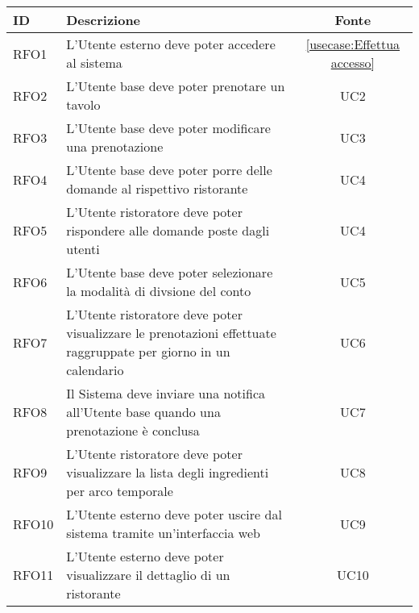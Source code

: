 \begin{table}[H]
	\renewcommand{\arraystretch}{1.5}
	\centering
	\begin{tabularx}{\textwidth}{l|X|c}
		\textbf{ID} & \textbf{Descrizione}                                                                                                      & \textbf{Fonte} \\
		\hline
		RFO1        & L'Utente esterno deve poter accedere al sistema                                                                           & \autoref{usecase:Effettua accesso}            \\
		\hline
		RFO2        & L'Utente base deve poter prenotare un tavolo                                                                              & UC2            \\
		\hline
		RFO3        & L'Utente base deve poter modificare una prenotazione                                                                      & UC3            \\
		\hline
		RFO4        & L'Utente base deve poter porre delle domande al rispettivo ristorante                                                     & UC4            \\
		\hline
		RFO5        & L'Utente ristoratore deve poter rispondere alle domande poste dagli utenti                                                & UC4            \\
		\hline
		RFO6        & L'Utente base deve poter selezionare la modalità di divsione del conto                                                    & UC5            \\
		\hline
		RFO7        & L'Utente ristoratore deve poter visualizzare le prenotazioni effettuate raggruppate per giorno in un calendario           & UC6            \\
		\hline
		RFO8        & Il Sistema deve inviare una notifica all'Utente base quando una prenotazione è conclusa                                   & UC7            \\
		\hline
		RFO9        & L'Utente ristoratore deve poter visualizzare la lista degli ingredienti per arco temporale                                & UC8            \\
		\hline
		RFO10       & L'Utente esterno deve poter uscire dal sistema tramite un'interfaccia web                                                 & UC9            \\
		\hline
		RFO11       & L'Utente esterno deve poter visualizzare il dettaglio di un ristorante                                                    & UC10           \\

\end{tabularx}
\end{table}
